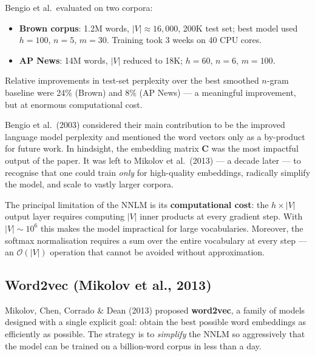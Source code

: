 \documentclass[11pt,a4paper]{article}
\newcommand{\term}[1]{\textcolor{DefGreen}{\textbf{#1}}}
\begin{document}
Bengio et al.\ evaluated on two corpora:
\begin{itemize}
  \item \textbf{Brown corpus}: 1.2M words, $|V| \approx 16{,}000$, 200K test set; best model used $h=100$, $n=5$, $m=30$. Training took 3 weeks on 40 CPU cores.
  \item \textbf{AP News}: 14M words, $|V|$ reduced to 18K; $h=60$, $n=6$, $m=100$.
\end{itemize}

Relative improvements in test-set perplexity over the best smoothed $n$-gram baseline were 24\% (Brown) and 8\% (AP News) — a meaningful improvement, but at enormous computational cost.

\begin{insightbox}
Bengio et al.\ (2003) considered their main contribution to be the improved language model perplexity and mentioned the word vectors only as a by-product for future work. In hindsight, the embedding matrix $\mathbf{C}$ was the most impactful output of the paper. It was left to Mikolov et al.\ (2013) — a decade later — to recognise that one could train \emph{only} for high-quality embeddings, radically simplify the model, and scale to vastly larger corpora.
\end{insightbox}

The principal limitation of the NNLM is its \textbf{computational cost}: the $h \times |V|$ output layer requires computing $|V|$ inner products at every gradient step. With $|V| \sim 10^6$ this makes the model impractical for large vocabularies. Moreover, the softmax normalisation requires a sum over the entire vocabulary at every step — an $\mathcal{O}(|V|)$ operation that cannot be avoided without approximation.

\subsection{Word2vec (Mikolov et al., 2013)}
\label{sec:word2vec}

Mikolov, Chen, Corrado \& Dean (2013) proposed \term{word2vec}, a family of models designed with a single explicit goal: obtain the best possible word embeddings as efficiently as possible. The strategy is to \emph{simplify} the NNLM so aggressively that the model can be trained on a billion-word corpus in less than a day.
\end{document}
